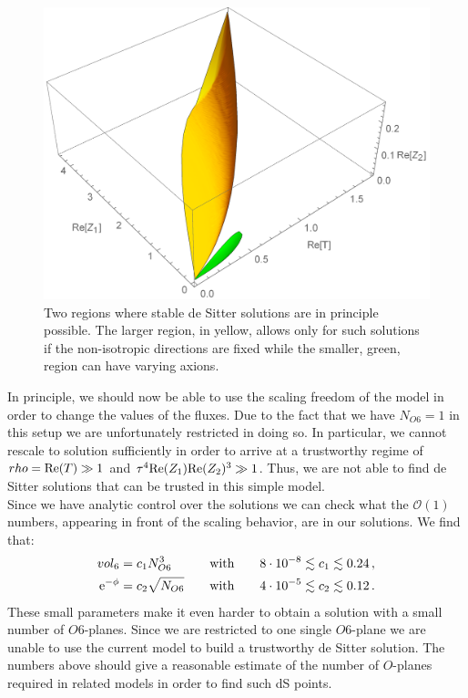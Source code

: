 \documentclass[12pt]{report}
\newcommand{\bea}{\begin{equation}\begin{aligned}}
\newcommand{\eea}{\end{aligned}\end{equation}}
\def\rme{{\rm e}}
\def\rmre{{\rm Re}}
\begin{document}
\begin{figure}[htb]
     \centering
     \includegraphics[scale=0.6]{tworegs.pdf}
     \caption{Two regions where stable de Sitter solutions are in principle possible. The larger region, in yellow, allows only for such solutions if the non-isotropic directions are fixed while the smaller, green, region can have varying axions.}
     \label{fig:tworeg}
\end{figure}
In principle, we should now be able to use the scaling freedom of the model in order to change the values of the fluxes. Due to the fact that we have $N_{O6} = 1$ in this setup we are unfortunately restricted in doing so. In particular, we cannot rescale to solution sufficiently in order to arrive at a trustworthy regime of $rho = \rmre(T) \gg 1 $ and $\tau^ 4 \rmre(Z_1) \rmre(Z_2)^ 3 \gg 1$. Thus, we are not able to find de Sitter solutions that can be trusted in this simple model.\\
Since we have analytic control over the solutions we can check what the $\mathcal{O}(1)$ numbers, appearing in front of the scaling behavior, are in our solutions. We find that:
\bea 
vol_6 &= c_1 N^ 3_{O6} \qquad\quad \text{with} \qquad 8 \cdot 10^ {-8} \lesssim c_1 \lesssim 0.24\,,\\
\rme^ {-\phi} &= c_2 \sqrt{N_{O6}} \qquad \text{with} \qquad 4 \cdot 10^ {-5} \lesssim c_2 \lesssim 0.12\,.
\eea
These small parameters make it even harder to obtain a solution with a small number of $O6$-planes. Since we are restricted to one single $O6$-plane we are unable to use the current model to build a trustworthy de Sitter solution. The numbers above should give a reasonable estimate of the number of $O$-planes required in related models in order to find such dS points.
\end{document}
